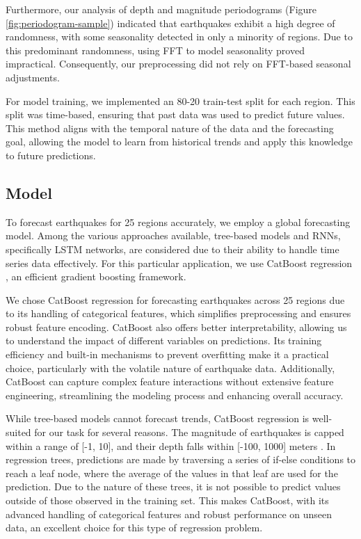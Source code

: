 Furthermore, our analysis of depth and magnitude periodograms (Figure \ref{fig:periodogram-sample})
indicated that earthquakes
exhibit a high degree of randomness, with some seasonality detected in only a minority
of regions. Due to this predominant randomness, using \ac{FFT}
to model seasonality proved impractical. Consequently, our preprocessing did not
rely on \ac{FFT}-based seasonal adjustments.

For model training, we implemented an 80-20 train-test split for each region. This
split was time-based, ensuring that past data was used to predict future values.
This method aligns with the temporal nature of the data and the forecasting goal,
allowing the model to learn from historical trends and apply this knowledge to
future predictions.

\subsection{Model}

To forecast earthquakes for 25 regions accurately, we employ a global forecasting model.
Among the various approaches available, tree-based models and \ac{RNNs}, specifically
\ac{LSTM} networks, are considered due to their ability to handle time series data
effectively. For this particular application, we use CatBoost regression
\parencite{prokhorenkova2018catboost}, an efficient gradient boosting framework.

We chose CatBoost regression for forecasting earthquakes across 25 regions due to
its handling of categorical features, which simplifies preprocessing and ensures
robust feature encoding. CatBoost also offers better interpretability, allowing us
to understand the impact of different variables on predictions. Its training
efficiency and built-in mechanisms to prevent overfitting make it a practical
choice, particularly with the volatile nature of earthquake data. Additionally,
CatBoost can capture complex feature interactions without extensive feature
engineering, streamlining the modeling process and enhancing overall accuracy.

While tree-based models cannot forecast trends, CatBoost regression
is well-suited for our task for several reasons. The magnitude of
earthquakes is capped within a range of [-1, 10], and their depth falls within
  [-100, 1000] meters \parencite{earthquake-data}. In regression trees, predictions
are made by traversing a series of if-else conditions to reach a leaf node, where
the average of the values in that leaf are used for the prediction. Due to the
nature of these trees, it is not possible to predict values outside of those
observed in the training set. This makes CatBoost, with its advanced handling
of categorical features and robust performance on unseen data, an excellent
choice for this type of regression problem.

